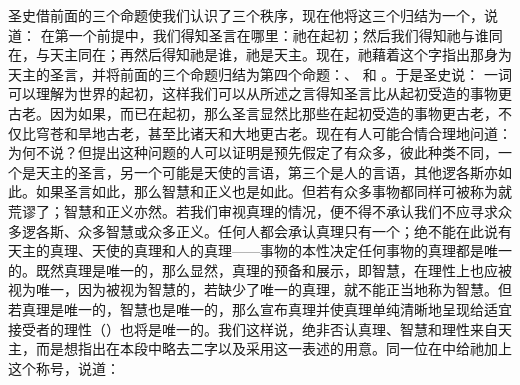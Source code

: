  圣史借前面的三个命题使我们认识了三个秩序，现在他将这三个归结为一个，说道： 在第一个前提中，我们得知圣言在哪里：祂在起初；然后我们得知祂与谁同在，与天主同在；再然后得知祂是谁，祂是天主。现在，祂藉着这个字指出那身为天主的圣言，并将前面的三个命题归结为第四个命题：、 和 。于是圣史说： 一词可以理解为世界的起初，这样我们可以从所述之言得知圣言比从起初受造的事物更古老。因为如果，而已在起初，那么圣言显然比那些在起初受造的事物更古老，不仅比穹苍和旱地古老，甚至比诸天和大地更古老。现在有人可能合情合理地问道：为何不说？但提出这种问题的人可以证明是预先假定了有众多，彼此种类不同，一个是天主的圣言，另一个可能是天使的言语，第三个是人的言语，其他逻各斯亦如此。如果圣言如此，那么智慧和正义也是如此。但若有众多事物都同样可被称为就荒谬了；智慧和正义亦然。若我们审视真理的情况，便不得不承认我们不应寻求众多逻各斯、众多智慧或众多正义。任何人都会承认真理只有一个；绝不能在此说有天主的真理、天使的真理和人的真理——事物的本性决定任何事物的真理都是唯一的。既然真理是唯一的，那么显然，真理的预备和展示，即智慧，在理性上也应被视为唯一，因为被视为智慧的，若缺少了唯一的真理，就不能正当地称为智慧。但若真理是唯一的，智慧也是唯一的，那么宣布真理并使真理单纯清晰地呈现给适宜接受者的理性（）也将是唯一的。我们这样说，绝非否认真理、智慧和理性来自天主，而是想指出在本段中略去二字以及采用这一表述的用意。同一位在中给祂加上这个称号，说道：  
